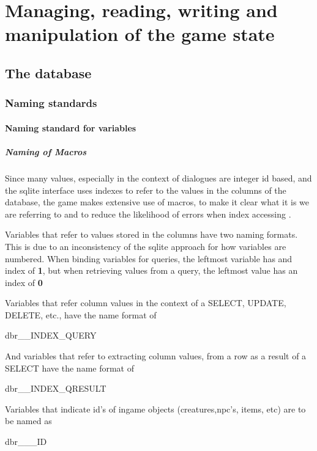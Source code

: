 \documentclass{report}
\begin{document}
\section*{Managing, reading, writing and manipulation of the game state}
\subsection*{The database}
\subsubsection*{Naming standards}
\paragraph*{Naming standard for variables}
\subparagraph*{Naming of Macros}
Since many values, especially in the context of dialogues are integer id based, and the sqlite interface uses indexes to refer to the values in the columns of the database, the game makes extensive use of macros, to make it clear what it is we are referring to and to reduce the likelihood of errors when index accessing .\newline

Variables that refer to values stored in the columns have two naming formats. This is due to an inconsistency of the sqlite approach for how variables are numbered. When binding variables for queries, the leftmost variable has and index of \textbf{1}, but when retrieving values from a query, the leftmost value has an index of \textbf{0}

Variables that refer column values in the context of a SELECT, UPDATE, DELETE, etc., have the name format of 

\begin{center}
dbr\_<table name>\_<column name>INDEX\_QUERY
\end{center}

And variables that refer to extracting column values, from a row as a result of a SELECT have the name format of

\begin{center}
dbr\_<table name>\_<column name>INDEX\_QRESULT
\end{center}

Variables that indicate id's of ingame objects (creatures,npc's, items, etc) are to be named as 

\begin{center}
dbr\_<table name>\_<OBJECT NAME>\_ID
\end{center}
\end{document}
